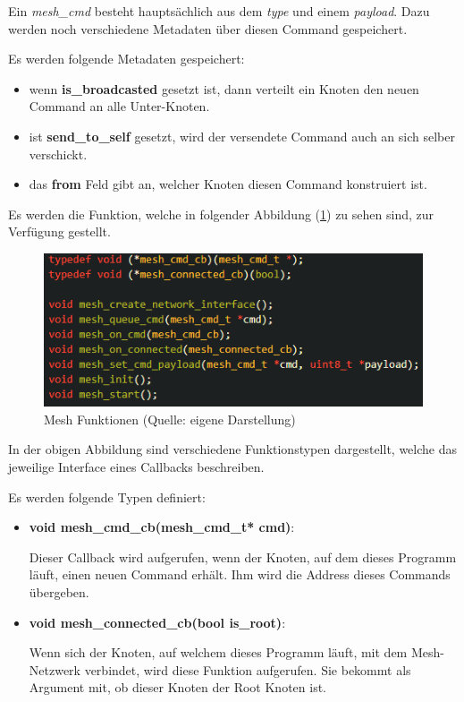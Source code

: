 Ein \textit{mesh\_cmd} besteht hauptsächlich aus dem \textit{type} und einem \textit{payload}. Dazu werden noch verschiedene Metadaten über diesen Command gespeichert.

Es werden folgende Metadaten gespeichert:

\begin{itemize}
    \item wenn \textbf{is\_broadcasted} gesetzt ist, dann verteilt ein Knoten den neuen Command an alle Unter-Knoten. 
    \item ist \textbf{send\_to\_self} gesetzt, wird der versendete Command auch an sich selber verschickt.
    \item das \textbf{from} Feld gibt an, welcher Knoten diesen Command konstruiert ist.
\end{itemize}

Es werden die Funktion, welche in folgender Abbildung (\ref{abb:mesh_functions}) zu sehen sind, zur Verfügung gestellt.

\begin{figure}[H]
    \begin{center}
        \includegraphics[scale=1]{images/mesh_functions.png}
        \caption{Mesh Funktionen (Quelle: eigene Darstellung)}
        \label{abb:mesh_functions}
    \end{center}
\end{figure}

In der obigen Abbildung sind verschiedene Funktionstypen dargestellt, welche das jeweilige Interface eines Callbacks beschreiben.

Es werden folgende Typen definiert:

\begin{itemize}
    \item \textbf{void mesh\_cmd\_cb(mesh\_cmd\_t* cmd)}:

    Dieser Callback wird aufgerufen, wenn der Knoten, auf dem dieses Programm läuft, einen neuen Command erhält. Ihm wird die Address dieses Commands übergeben.

    \item \textbf{void mesh\_connected\_cb(bool is\_root)}:
    
    Wenn sich der Knoten, auf welchem dieses Programm läuft, mit dem Mesh-Netzwerk verbindet, wird diese Funktion aufgerufen. Sie bekommt als Argument mit, ob dieser Knoten der Root Knoten ist.
\end{itemize}

